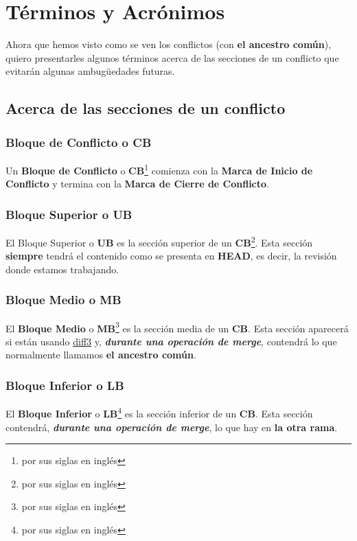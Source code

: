 
\section{Términos y Acrónimos}

Ahora que hemos visto como se ven los conflictos (con {\bf el ancestro común}), quiero presentarles algunos
términos acerca de las secciones de un conflicto que evitarán algunas ambugüedades futuras.

\subsection{Acerca de las secciones de un conflicto}

\subsubsection{Bloque de Conflicto o CB}
Un {\bf Bloque de Conflicto} o {\bf CB}\footnote{por sus siglas en inglés} comienza con la {\bf Marca de Inicio de Conflicto} y termina con la {\bf Marca de Cierre de Conflicto}.

\subsubsection{Bloque Superior o UB}
El Bloque Superior o {\bf UB} es la sección superior de un {\bf CB}\footnote{por sus siglas en inglés}. Esta sección
{\bf siempre} tendrá el contenido como se presenta en {\bf HEAD}, es decir, la revisión donde estamos trabajando.

\subsubsection{Bloque Medio o MB}
El {\bf Bloque Medio} o {\bf MB}\footnote{por sus siglas en inglés} es la sección media de un {\bf CB}. Esta sección aparecerá
si están usando \hyperref[diff3]{diff3} y, {\bf\it durante una operación de merge}, contendrá lo que normalmente llamamos
{\bf el ancestro común}.

\subsubsection{Bloque Inferior o LB}
El {\bf Bloque Inferior} o {\bf LB}\footnote{por sus siglas en inglés} es la sección inferior de un {\bf CB}. Esta sección
contendrá, {\bf\it durante una operación de merge}, lo que hay en {\bf la otra rama}.

